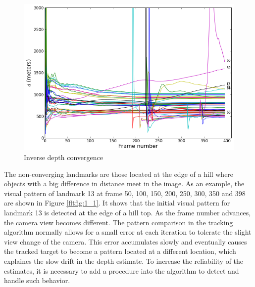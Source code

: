 \begin{figure}[h]
\centering
\includegraphics[width=12cm, keepaspectratio=true]{./Figures/fltfig/cut1/Figure10.png}
\caption{Inverse depth convergence}
\label{fltfig:1}
\end{figure}

The non-converging landmarks are those located at the edge of a hill
where objects with a big difference in distance meet in the image. As
an example, the visual pattern of landmark 13 at frame 50, 100, 150,
200, 250, 300, 350 and 398 are shown in Figure \ref{fltfig:1_1}. It
shows that the initial visual pattern for landmark 13 is detected at
the edge of a hill top. As the frame number advances, the camera view
becomes different. The pattern comparison in the tracking algorithm
normally allows for a small error at each iteration to tolerate the
slight view change of the camera. This error accumulates slowly and
eventually causes the tracked target to become a pattern located at a
different location, which explaines the slow drift in the depth
estimate. To increase the reliability of the estimates, it is
necessary to add a procedure into the algorithm to detect and handle
such behavior.

